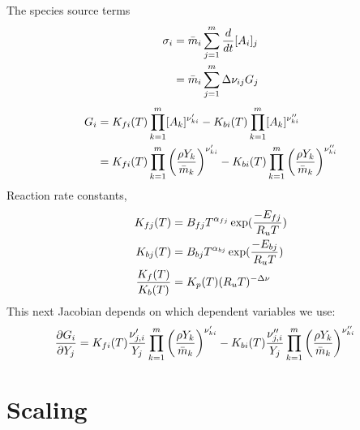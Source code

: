 \documentclass[10pt]{article}
\begin{document}
The species source terms
\begin{align}
    \sigma_i & = \bar{m}_i \sum_{j=1}^m {d \over dt} [A_i]_j \\
             & = \bar{m}_i \sum_{j=1}^m \Delta \nu_{ij} G_j
\end{align}
\begin{align}
    G_i &=  K_{fi}(T)\prod_{k=1}^{m} [A_k]^{\nu_{ki}'} -  K_{bi}(T)\prod_{k=1}^{m} [A_k]^{\nu_{ki}''} \\
        &=  K_{fi}(T)\prod_{k=1}^{m} \left({\rho Y_k \over \bar{m}_k} \right)^{\nu_{ki}'}
         -  K_{bi}(T)\prod_{k=1}^{m}  \left({\rho Y_k \over \bar{m}_k} \right)^{\nu_{ki}''}
\end{align}
Reaction rate constants, 
\begin{align}
  K_{fj}(T) &=  B_{fj} T^{\alpha_{fj}} \exp({-E_{fj} \over R_u T}) \\
  K_{bj}(T) &=  B_{bj} T^{\alpha_{bj}} \exp({-E_{bj} \over R_u T}) \\
  {K_f(T)\over K_b(T)} &= K_p(T) (R_u T)^{-\Delta \nu}
\end{align}
This next Jacobian depends on which dependent variables we use:
\begin{align}
    {\partial G_i \over \partial Y_j} &= 
            K_{fi}(T) {\nu_{j,i}' \over Y_j}  \prod_{k=1}^{m} \left({\rho Y_k \over \bar{m}_k} \right)^{\nu_{ki}'}
         -  K_{bi}(T){\nu_{j,i}''\over Y_j}  \prod_{k=1}^{m}  \left({\rho Y_k \over \bar{m}_k} \right)^{\nu_{ki}''}
\end{align}

\section{Scaling}

\newcommand{\rhot}{\tilde{\rho}}
\newcommand{\jvt}{\tilde{\jv}}
\newcommand{\vvt}{\tilde{\vv}}
\newcommand{\sigmat}{\tilde{\sigma}}
\newcommand{\pt}{\tilde{p}}
\newcommand{\ttt}{\tilde{t}}
\newcommand{\Tt}{\tilde{T}}
\newcommand{\gradt}{\tilde{\grad}}
\newcommand{\Deltat}{\tilde{\Delta}}
\newcommand{\lambdat}{\tilde{\lambda}}
\newcommand{\ct}{\tilde{c}}
\newcommand{\hht}{\tilde{h}}
\newcommand{\Rt}{\tilde{R}}
\newcommand{\Dt}{\tilde{D}}
\newcommand{\mut}{\tilde{\mu}}
\newcommand{\Phit}{\tilde{\Phi}}
\end{document}

